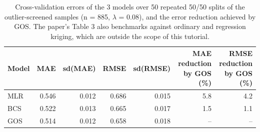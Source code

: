 \begin{table}[t]\centering
\caption{Cross-validation errors of the 3 models over 50 repeated 50/50 splits of the outlier-screened samples (n = 885, $\lambda$ = 0.08), and the error reduction achieved by GOS. The paper's Table 3 also benchmarks against ordinary and regression kriging, which are outside the scope of this tutorial.}\label{tab:models}
\begin{tabular}{lrrrrrr}
\hline
Model & MAE & sd(MAE) & RMSE & sd(RMSE) & MAE reduction by GOS (\%) & RMSE reduction by GOS (\%) \\
\hline
MLR & 0.546 & 0.012 & 0.686 & 0.015 & 5.8 & 4.2 \\
BCS & 0.522 & 0.013 & 0.665 & 0.017 & 1.5 & 1.1 \\
GOS & 0.514 & 0.012 & 0.658 & 0.018 & -- & -- \\
\hline
\end{tabular}\end{table}
